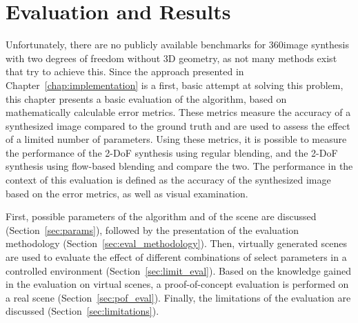 \chapter{Evaluation and Results} \label{chap:evaluation}
Unfortunately, there are no publicly available benchmarks for 360\degree image synthesis with two degrees of freedom without 3D geometry, as not many methods exist that try to achieve this. Since the approach presented in Chapter~\ref{chap:implementation} is a first, basic attempt at solving this problem, this chapter presents a basic evaluation of the algorithm, based on mathematically calculable error metrics. These metrics measure the accuracy of a synthesized image compared to the ground truth and are used to assess the effect of a limited number of parameters. Using these metrics, it is possible to measure the performance of the 2-DoF synthesis using regular blending, and the 2-DoF synthesis using flow-based blending and compare the two.
The performance in the context of this evaluation is defined as the accuracy of the synthesized image based on the error metrics, as well as visual examination.

First, possible parameters of the algorithm and of the scene are discussed (Section~\ref{sec:params}), followed by the presentation of the evaluation methodology (Section~\ref{sec:eval_methodology}).
Then, virtually generated scenes are used to evaluate the effect of different combinations of select parameters in a controlled environment (Section~\ref{sec:limit_eval}).
Based on the knowledge gained in the evaluation on virtual scenes, a proof-of-concept evaluation is performed on a real scene (Section~\ref{sec:pof_eval}). Finally, the limitations of the evaluation are discussed (Section~\ref{sec:limitations}).




